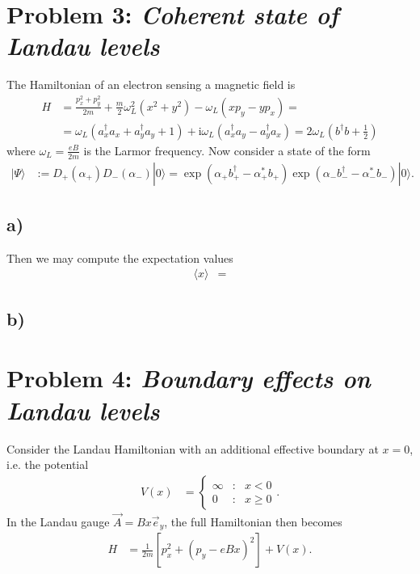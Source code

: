 \documentclass[english, parskip=full]{scrartcl}
\newcommand{\bra}{}
\newcommand{\kla}{}
\newcommand{\klam}{}
\newcommand{\Ket}{}
\renewcommand{\i}{\text{i}}
\begin{document}
\section*{Problem 3: \normalfont\textit{\large{Coherent state of Landau levels}}}
The Hamiltonian of an electron sensing a magnetic field is
\begin{align}
H &= \frac{p_x^2 + p_y^2}{2m} + \frac{m}{2}\omega_L^2 (x^2+y^2) - \omega_L (xp_y-yp_x) = \\
&= \omega_L\kla\left( a_x^\dagger a_x + a_y^\dagger a_y + 1 \right) + \i\omega_L\kla\left( a_x^\dagger a_y - a_y^\dagger a_x \right) = 2\omega_L\kla\left( b^\dagger b + \frac{1}{2} \right)
\end{align}
where $\omega_L = \frac{eB}{2m}$ is the Larmor frequency.
Now consider a state of the form
\begin{align}
\Ket | \Psi \rangle &:= D_+(\alpha_+)D_-(\alpha_-) \Ket | 0 \rangle = \exp\kla\left( \alpha_+b_+^\dagger - \alpha_+^\ast b_+ \right)  \exp\kla\left( \alpha_-b_-^\dagger - \alpha_-^\ast b_- \right) \Ket | 0 \rangle.
\end{align}
\subsection*{a)}
Then we may compute the expectation values
\begin{align}
\bra\langle x \rangle &= 
\end{align}
\subsection*{b)}

\section*{Problem 4: \normalfont\textit{\large{Boundary effects on Landau levels}}}
Consider the Landau Hamiltonian with an additional effective boundary at $x=0$, i.e. the potential
\begin{align}
V(x) &= \left\{\begin{matrix}
\infty & : & x<0 \\ 0 & : &  x\ge 0
\end{matrix} \right. .
\end{align}
In the Landau gauge $\vec{A} = Bx\vec{e}_y$, the full Hamiltonian then becomes
\begin{align}
H &= \frac{1}{2m}\klam\left[ p_x^2 + \kla\left( p_y - eBx \right)^2 \right] + V(x).
\end{align}
\end{document}
